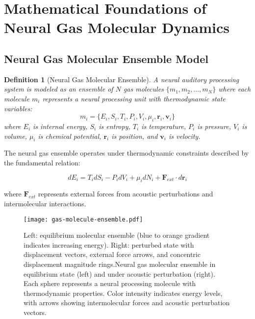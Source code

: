 \documentclass[12pt,a4paper]{article}
\newtheorem{definition}[theorem]{Definition}
\begin{document}
\section{Mathematical Foundations of Neural Gas Molecular Dynamics}

\subsection{Neural Gas Molecular Ensemble Model}

\begin{definition}[Neural Gas Molecular Ensemble]
A neural auditory processing system is modeled as an ensemble of $N$ gas molecules $\{m_1, m_2, \ldots, m_N\}$ where each molecule $m_i$ represents a neural processing unit with thermodynamic state variables:
\begin{equation}
m_i = \{E_i, S_i, T_i, P_i, V_i, \mu_i, \mathbf{r}_i, \mathbf{v}_i\}
\end{equation}
where $E_i$ is internal energy, $S_i$ is entropy, $T_i$ is temperature, $P_i$ is pressure, $V_i$ is volume, $\mu_i$ is chemical potential, $\mathbf{r}_i$ is position, and $\mathbf{v}_i$ is velocity.
\end{definition}

The neural gas ensemble operates under thermodynamic constraints described by the fundamental relation:

\begin{equation}
dE_i = T_i dS_i - P_i dV_i + \mu_i dN_i + \mathbf{F}_{ext} \cdot d\mathbf{r}_i
\end{equation}

where $\mathbf{F}_{ext}$ represents external forces from acoustic perturbations and intermolecular interactions.

\begin{figure}[h]
\centering
\texttt{[image: gas-molecule-ensemble.pdf]}
\caption{Left: equilibrium molecular ensemble (blue to orange gradient indicates increasing energy). Right: perturbed state with displacement vectors, external force arrows, and concentric displacement magnitude rings.Neural gas molecular ensemble in equilibrium state (left) and under acoustic perturbation (right). Each sphere represents a neural processing molecule with thermodynamic properties. Color intensity indicates energy levels, with arrows showing intermolecular forces and acoustic perturbation vectors.}
\label{gas-molecule-ensemble}
\end{figure}
\end{document}
